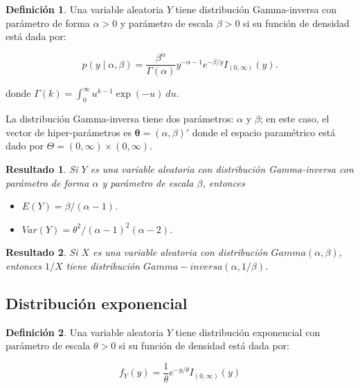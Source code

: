 \documentclass[
  10pt,
  spanish,
]{book}
\providecommand{\tightlist}{%
  \setlength{\itemsep}{0pt}\setlength{\parskip}{0pt}}
\newtheorem{proposition}{Resultado}[chapter]
\theoremstyle{definition}
\newtheorem{definition}{Definición}[chapter]
\theoremstyle{definition}
\theoremstyle{definition}
\theoremstyle{definition}
\theoremstyle{remark}
\begin{document}
\begin{definition}
\protect\hypertarget{def:unnamed-chunk-25}{}{\label{def:unnamed-chunk-25} }Una variable aleatoria \(Y\) tiene distribución Gamma-inversa con parámetro de forma \(\alpha>0\) y parámetro de escala \(\beta>0\) si su función de densidad está dada por:

\begin{equation}
p(y \mid \alpha,\beta)=\frac{\beta^\alpha}{\Gamma(\alpha)}y^{-\alpha-1} e^{-\beta/y}I_{(0,\infty)}(y).
\end{equation}

donde \(\Gamma(k)=\int_0^{\infty}u^{k-1}\exp(-u)\ du\).
\end{definition}

La distribución Gamma-inversa tiene dos parámetros: \(\alpha\) y \(\beta\); en este caso, el vector de hiper-parámetros es \(\boldsymbol \theta=(\alpha,\beta)'\) donde el espacio paramétrico está dado por \(\Theta=(0,\infty)\times(0,\infty)\).

\begin{proposition}
\protect\hypertarget{prp:unnamed-chunk-26}{}{\label{prp:unnamed-chunk-26} }Si \(Y\) es una variable aleatoria con distribución Gamma-inversa con parámetro de forma \(\alpha\) y parámetro de escala \(\beta\), entonces

\begin{itemize}
\tightlist
\item
  \(E(Y)=\beta/(\alpha-1)\).
\item
  \(Var(Y)=\theta^2/(\alpha-1)^2(\alpha-2)\).
\end{itemize}
\end{proposition}

\begin{proposition}
\protect\hypertarget{prp:gammainver}{}{\label{prp:gammainver} }Si \(X\) es una variable aleatoria con distribución \(Gamma(\alpha,\beta)\), entonces \(1/X\) tiene distribución \(Gamma-inversa(\alpha,1/\beta)\).
\end{proposition}

\hypertarget{distribuciuxf3n-exponencial}{%
\subsection{Distribución exponencial}\label{distribuciuxf3n-exponencial}}

\begin{definition}
\protect\hypertarget{def:unnamed-chunk-27}{}{\label{def:unnamed-chunk-27} }Una variable aleatoria \(Y\) tiene distribución exponencial con parámetro de escala \(\theta>0\) si su función de densidad está dada por:

\begin{equation}
f_Y(y)=\frac{1}{\theta}e^{-y/\theta}I_{(0,\infty)}(y)
\end{equation}
\end{definition}
\end{document}
